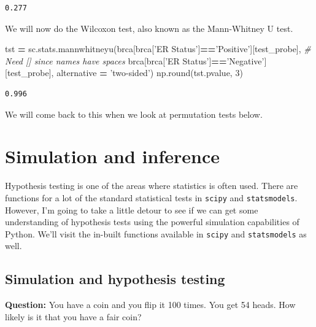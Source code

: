 \documentclass[
  letterpaper,
]{scrbook}
\newenvironment{Shaded}{\begin{snugshade}}{\end{snugshade}}
\newcommand{\BuiltInTok}[1]{#1}
\newcommand{\CommentTok}[1]{\textcolor[rgb]{0.56,0.35,0.01}{\textit{#1}}}
\newcommand{\DecValTok}[1]{\textcolor[rgb]{0.00,0.00,0.81}{#1}}
\newcommand{\NormalTok}[1]{#1}
\newcommand{\OperatorTok}[1]{\textcolor[rgb]{0.81,0.36,0.00}{\textbf{#1}}}
\newcommand{\StringTok}[1]{\textcolor[rgb]{0.31,0.60,0.02}{#1}}
\begin{document}
\begin{verbatim}
0.277
\end{verbatim}

We will now do the Wilcoxon test, also known as the Mann-Whitney U test.

\begin{Shaded}
\begin{Highlighting}[]
\NormalTok{tst }\OperatorTok{=}\NormalTok{ sc.stats.mannwhitneyu(brca[brca[}\StringTok{'ER Status'}\NormalTok{]}\OperatorTok{==}\StringTok{'Positive'}\NormalTok{][test_probe], }\CommentTok{# Need [] since names have spaces}
\NormalTok{                   brca[brca[}\StringTok{'ER Status'}\NormalTok{]}\OperatorTok{==}\StringTok{'Negative'}\NormalTok{][test_probe], }
\NormalTok{                  alternative }\OperatorTok{=} \StringTok{'two-sided'}\NormalTok{)}
\NormalTok{np.}\BuiltInTok{round}\NormalTok{(tst.pvalue, }\DecValTok{3}\NormalTok{)}
\end{Highlighting}
\end{Shaded}

\begin{verbatim}
0.996
\end{verbatim}

We will come back to this when we look at permutation tests below.

\hypertarget{simulation-and-inference}{%
\section{Simulation and inference}\label{simulation-and-inference}}

Hypothesis testing is one of the areas where statistics is often used. There are functions for a lot of the standard statistical tests in \texttt{scipy} and \texttt{statsmodels}. However, I'm going to take a little detour to see if we can get some understanding of hypothesis tests using the powerful simulation capabilities of Python. We'll visit the in-built functions available in \texttt{scipy} and \texttt{statsmodels} as well.

\hypertarget{simulation-and-hypothesis-testing}{%
\subsection{Simulation and hypothesis testing}\label{simulation-and-hypothesis-testing}}

\textbf{Question:} You have a coin and you flip it 100 times. You get 54 heads. How likely is it that you have a fair coin?
\end{document}
